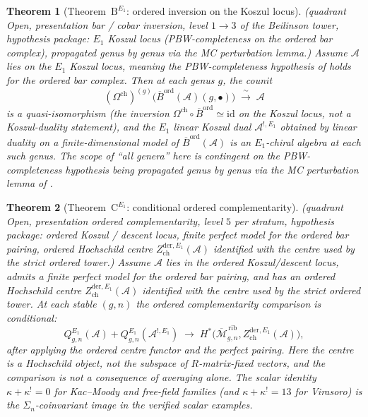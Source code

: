 \documentclass[11pt,reqno]{amsart}
\newtheorem{theorem}{Theorem}[section]
\theoremstyle{definition}
\theoremstyle{remark}
\newcommand{\cA}{\mathcal{A}}
\newcommand{\cM}{\mathcal{M}}
\newcommand{\Barord}{\overline{B}^{\mathrm{ord}}}
\newcommand{\Cobar}{\Omega^{\mathrm{ch}}}
\newcommand{\id}{\mathrm{id}}
\numberwithin{equation}{section}
\begin{document}
\begin{theorem}[Theorem~$\mathrm{B}^{E_{1}}$: ordered inversion on the Koszul locus]
\label{thm:e1-theorem-b}
\textup{(}\emph{quadrant} Open, \emph{presentation} bar / cobar
inversion, \emph{level} $1 \to 3$ of the Beilinson tower,
\emph{hypothesis package}: $E_{1}$ Koszul locus
\textup{(}PBW-completeness on the ordered bar
complex\textup{)}, propagated genus by genus via the MC
perturbation lemma.\textup{)}
Assume $\cA$ lies on the $E_{1}$ Koszul locus, meaning the
PBW-completeness hypothesis of
\cite[Chapter~4]{Lorgat26I} holds for the ordered bar complex.
Then at each genus $g$, the counit
\[
(\Cobar)^{(g)}\!\bigl(\Barord(\cA)(g,\bullet)\bigr)
\;\xrightarrow{\;\sim\;}\; \cA
\]
is a quasi-isomorphism (the inversion $\Cobar \circ \Barord
\simeq \id$ on the Koszul locus, not a Koszul-duality statement),
and the $E_{1}$ linear Koszul dual $\cA^{!,E_{1}}$ obtained by
linear duality on a finite-dimensional model of $\Barord(\cA)$ is
an $E_{1}$-chiral algebra at each such genus. The scope of ``all
genera'' here is contingent on the PBW-completeness hypothesis
being propagated genus by genus via the MC perturbation lemma of
\cite[Chapter~9]{Lorgat26I}.
\end{theorem}

\begin{theorem}[Theorem~$\mathrm{C}^{E_{1}}$: conditional ordered complementarity]
\label{thm:e1-theorem-c}
\textup{(}\emph{quadrant} Open, \emph{presentation} ordered
complementarity, \emph{level} $5$ per stratum, \emph{hypothesis
package}: ordered Koszul / descent locus, finite perfect model for
the ordered bar pairing, ordered Hochschild centre
$Z^{\mathrm{der},E_1}_{\mathrm{ch}}(\cA)$ identified with the
centre used by the strict ordered tower.\textup{)}
Assume $\cA$ lies in the ordered Koszul/descent locus, admits a
finite perfect model for the ordered bar pairing, and has an
ordered Hochschild centre
$Z^{\mathrm{der},E_1}_{\mathrm{ch}}(\cA)$ identified with the
centre used by the strict ordered tower. At each stable $(g,n)$
the ordered complementarity comparison is conditional:
\begin{equation}
\label{eq:e1-complementarity}
Q_{g,n}^{E_{1}}(\cA) + Q_{g,n}^{E_{1}}(\cA^{!,E_{1}})
\;\longrightarrow\;
H^{*}\!\bigl(\overline{\cM}_{g,n}^{\,\mathrm{rib}},
Z^{\mathrm{der},E_1}_{\mathrm{ch}}(\cA)\bigr),
\end{equation}
after applying the ordered centre functor and the perfect pairing.
Here the centre is a Hochschild object, not the subspace of
$R$-matrix-fixed vectors, and the comparison is not a consequence
of averaging alone. The scalar identity
$\kappa + \kappa^{!} = 0$ for Kac--Moody and free-field families
(and $\kappa + \kappa^{!} = 13$ for Virasoro) is the
$\Sigma_{n}$-coinvariant image in the verified scalar examples.
\end{theorem}
\end{document}
